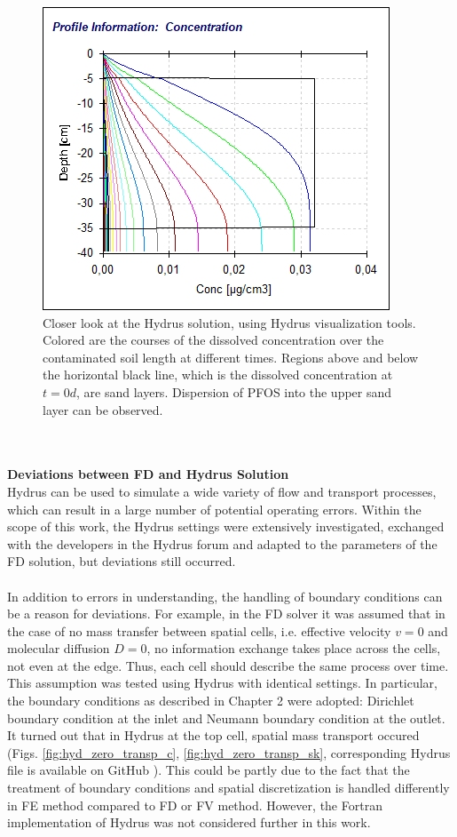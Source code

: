 \begin{figure}
	\centering
	\includegraphics[scale=0.7]{images/hyd_sand_profile.jpg}
\caption[Closer look at the Hydrus solution]{Closer look at the Hydrus solution, using Hydrus visualization tools. Colored are the courses of the dissolved concentration over the contaminated soil length at different times. Regions above and below the horizontal black line, which is the dissolved concentration at $t=0d$, are sand layers. Dispersion of PFOS into the upper sand layer can be observed.}
\label{fig:disc_hydrus_sand}
\end{figure}\\
\\
\textbf{Deviations between FD and Hydrus Solution}
\\
Hydrus can be used to simulate a wide variety of flow and transport processes, which can result in a large number of potential operating errors. Within the scope of this work, the Hydrus settings were extensively investigated, exchanged with the developers in the Hydrus forum and adapted to the parameters of the FD solution, but deviations still occurred.\\
\\
In addition to errors in understanding, the handling of boundary conditions can be a reason for deviations. For example, in the FD solver it was assumed that in the case of no mass transfer between spatial cells, i.e. effective velocity $v = 0$ and molecular diffusion $D=0$, no information exchange takes place across the cells, not even at the edge. Thus, each cell should describe the same process over time.\\
This assumption was tested using Hydrus with identical settings. In particular, the boundary conditions as described in Chapter 2 were adopted: Dirichlet boundary condition at the inlet and Neumann boundary condition at the outlet. It turned out that in Hydrus at the top cell, spatial mass transport occured (Figs. \ref{fig:hyd_zero_transp_c}, \ref{fig:hyd_zero_transp_sk}, corresponding Hydrus file is available on GitHub \cite{Hydrus_BA}). This could be partly due to the fact that the treatment of boundary conditions and spatial discretization is handled differently in FE method compared to FD or FV method. However, the Fortran implementation of Hydrus was not considered further in this work.\\
